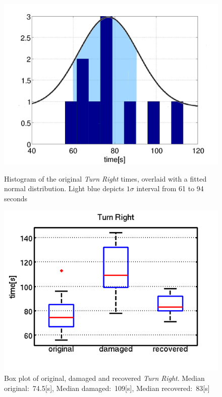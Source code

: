 \begin{figure}
\centering
{}
\includegraphics[width=\textwidth]{Files/Figures/hist_turn_right.png}
\caption[Histogram of turn right move]{Histogram of the original \textit{Turn Right} times, overlaid with a fitted normal distribution. Light blue depicts $1\sigma$ interval from 61 to 94 seconds}
\label{fig:hist_turn_right}
\endminipage\hfill
{}
\includegraphics[width=\textwidth]{Files/Figures/box_recovery.png}
\caption[Box plot of turn right move during fault recovery]{Box plot of original, damaged and recovered \textit{Turn Right}. Median original:~74.5[s], Median damaged:~109[s], Median recovered:~83[s]}
\label{fig:box_recovery}
\endminipage\hfill
\end{figure}

